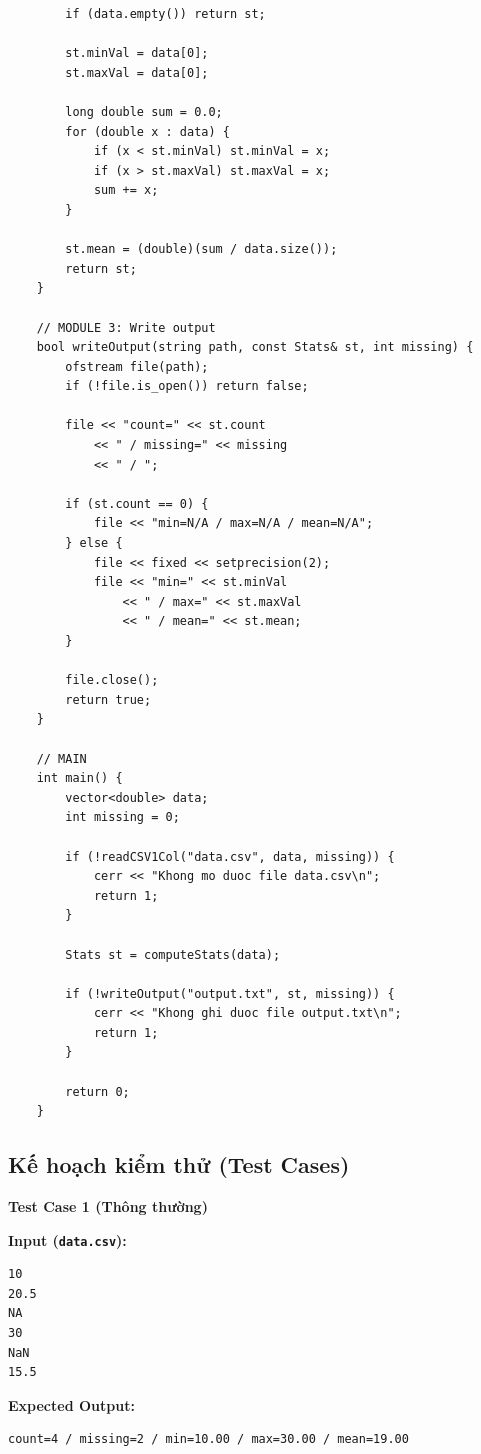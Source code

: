 \begin{lstlisting}
        if (data.empty()) return st;

        st.minVal = data[0];
        st.maxVal = data[0];

        long double sum = 0.0;
        for (double x : data) {
            if (x < st.minVal) st.minVal = x;
            if (x > st.maxVal) st.maxVal = x;
            sum += x;
        }

        st.mean = (double)(sum / data.size());
        return st;
    }

    // MODULE 3: Write output
    bool writeOutput(string path, const Stats& st, int missing) {
        ofstream file(path);
        if (!file.is_open()) return false;

        file << "count=" << st.count
            << " / missing=" << missing
            << " / ";

        if (st.count == 0) {
            file << "min=N/A / max=N/A / mean=N/A";
        } else {
            file << fixed << setprecision(2);
            file << "min=" << st.minVal
                << " / max=" << st.maxVal
                << " / mean=" << st.mean;
        }

        file.close();
        return true;
    }

    // MAIN
    int main() {
        vector<double> data;
        int missing = 0;

        if (!readCSV1Col("data.csv", data, missing)) {
            cerr << "Khong mo duoc file data.csv\n";
            return 1;
        }

        Stats st = computeStats(data);

        if (!writeOutput("output.txt", st, missing)) {
            cerr << "Khong ghi duoc file output.txt\n";
            return 1;
        }

        return 0;
    }
\end{lstlisting}

\subsection{Kế hoạch kiểm thử (Test Cases)}

\textbf{Test Case 1 (Thông thường)}

\textbf{Input (\texttt{data.csv}):}
\begin{lstlisting}
10
20.5
NA
30
NaN
15.5
\end{lstlisting}

\textbf{Expected Output:}
\begin{lstlisting}
count=4 / missing=2 / min=10.00 / max=30.00 / mean=19.00
\end{lstlisting}

